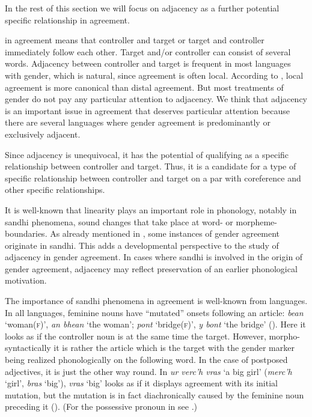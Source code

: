 \documentclass[output=collectionpaper]{langsci/langscibook}
\begin{document}
In the rest of this section we will focus on adjacency as a further potential specific relationship in agreement.

 in agreement means that controller and target or target and controller immediately follow each other. Target and/or controller can consist of several words. Adjacency between controller and target is frequent in most languages with gender, which is natural, since agreement is often local. According to \cite{Corbett2006}, local agreement is more canonical than distal agreement. But most treatments of gender do not pay any particular attention to adjacency. We think that adjacency is an important issue in agreement that deserves particular attention because there are several languages where gender agreement is predominantly or exclusively adjacent.

Since adjacency is unequivocal, it has the potential of qualifying as a specific relationship between controller and target. Thus, it is a candidate for a type of specific relationship between controller and target on a par with coreference and other specific relationships.

It is well-known that linearity plays an important role in phonology, notably in sandhi phenomena, sound changes that take place at word- or morpheme-boundaries. As already mentioned in , some instances of gender agreement originate in sandhi. This adds a developmental perspective to the study of adjacency in gender agreement. In cases where sandhi is involved in the origin of gender agreement, adjacency may reflect preservation of an earlier phonological motivation.

The importance of sandhi phenomena in agreement is well-known from  languages. In all  languages, feminine nouns have ``mutated'' onsets following an article:  \textit{bean} `woman(\textsc{f})', \textit{an bhean} `the woman';  \textit{pont} `bridge(\textsc{f})', \textit{y bont} `the bridge' (\citealt[480]{Fife1998}). Here it looks as if the controller noun is at the same time the target. However, morpho-syntactically it is rather the article which is the target with the gender marker being realized phonologically on the following word. In the case of postposed adjectives, it is just the other way round. In  \textit{ur verc'h vras} `a big girl' (\textit{merc'h} `girl', \textit{bras} `big'), \textit{vras} `big' looks as if it displays agreement with its initial mutation, but the mutation is in fact diachronically caused by the feminine noun preceding it (\citealt[480]{Fife1998}). (For the possessive pronoun in  see .)
\end{document}
